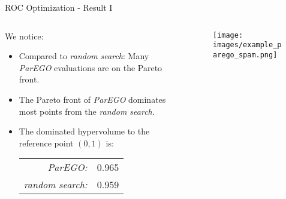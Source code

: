 \begin{frame}{ROC Optimization - Result I}

\begin{columns}
\begin{column}{0.45\textwidth}
  We notice:
  \begin{itemize}
    \item Compared to \emph{random search}: Many \emph{ParEGO} evaluations are on the Pareto front.
    \item The Pareto front of \emph{ParEGO} dominates most points from the \emph{random search}.
    \item The dominated hypervolume to the reference point $(0,1)$ is:
    \begin{tabular}{rl}
    \emph{ParEGO:} & 0.965\\
    \emph{random search:} & 0.959\\
    \end{tabular}
  \end{itemize}
\end{column}%
\begin{column}{0.5\textwidth}
  \begin{figure}
  \texttt{[image: images/example\_parego\_spam.png]}
  \end{figure}
\end{column}
\end{columns}

\end{frame}

